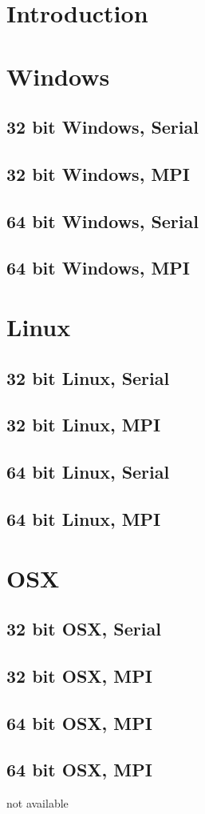 \documentclass[11pt,twoside]{article}
\newcommand{\fdssummary}[1]{
{
\scriptsize

}
}
\begin{document}
\section{Introduction}

\section{Windows}
\subsection{32 bit Windows, Serial}
\fdssummary{intel_win_32.out}
\subsection{32 bit Windows,  MPI}
\fdssummary{mpi_intel_win_32.out}
\subsection{64 bit Windows, Serial}
\fdssummary{intel_win_64.out}
\subsection{64 bit Windows,  MPI}
\fdssummary{mpi_intel_win_64.out}

\section{Linux}
\subsection{32 bit Linux, Serial}
\fdssummary{intel_linux_32.out}
\subsection{32 bit Linux, MPI}
\fdssummary{mpi_intel_linux_32.out}
\subsection{64 bit Linux, Serial}
\fdssummary{intel_linux_64.out}
\subsection{64 bit Linux, MPI}
\fdssummary{mpi_intel_linux_64.out}

\section{OSX}
\subsection{32 bit OSX, Serial}
\fdssummary{intel_osx_32.out}
\subsection{32 bit OSX, MPI}
\fdssummary{mpi_intel_osx_32.out}
\subsection{64 bit OSX, MPI}
\fdssummary{intel_osx_64.out}
\subsection{64 bit OSX, MPI}
not available
\end{document}
